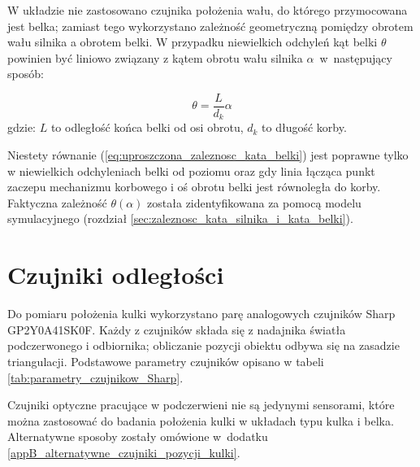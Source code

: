 W układzie nie zastosowano czujnika położenia wału, do którego przymocowana jest belka; zamiast tego wykorzystano zależność geometryczną pomiędzy obrotem wału silnika a obrotem belki. W przypadku niewielkich odchyleń kąt belki $\theta$ powinien być liniowo związany z kątem obrotu wału silnika $\alpha$~w~następujący sposób:

\begin{equation}\label{eq:uproszczona_zaleznosc_kata_belki}
    \theta = \frac{L}{d_k} \alpha
\end{equation}
gdzie: $L$ to odległość końca belki od osi obrotu, $d_k$ to długość korby.

Niestety równanie (\ref{eq:uproszczona_zaleznosc_kata_belki}) jest poprawne tylko w niewielkich odchyleniach belki od poziomu oraz gdy linia łącząca punkt zaczepu mechanizmu korbowego i oś obrotu belki jest równoległa do korby. Faktyczna zależność $\theta(\alpha)$ została zidentyfikowana za pomocą modelu symulacyjnego (rozdział \ref{sec:zaleznosc_kata_silnika_i_kata_belki}).

\section{Czujniki odległości}
\label{sec:ch3_czujniki_odleglosci}

Do pomiaru położenia kulki wykorzystano parę analogowych czujników Sharp GP2Y0A41SK0F. Każdy z czujników składa się z nadajnika światła podczerwonego i odbiornika; obliczanie pozycji obiektu odbywa się na zasadzie triangulacji. Podstawowe parametry czujników opisano w tabeli \ref{tab:parametry_czujnikow_Sharp}.

Czujniki optyczne pracujące w podczerwieni nie są jedynymi sensorami, które można zastosować do badania położenia kulki w układach typu kulka i belka. Alternatywne sposoby zostały omówione w~dodatku \ref{appB_alternatywne_czujniki_pozycji_kulki}.

